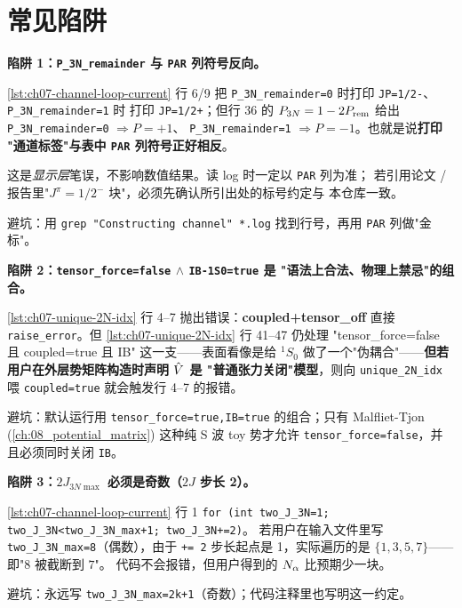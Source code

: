 \section{常见陷阱}
\label{sec:ch07-pitfalls}

\begin{pitfallbox}[label={box:ch07-pitfall-pi-print}]
\textbf{陷阱 1：\texttt{P\_3N\_remainder} 与 \texttt{PAR} 列符号反向。}

\cref{lst:ch07-channel-loop-current} 行 6/9 把
\verb|P_3N_remainder=0| 时打印 \verb|JP=1/2-|、\verb|P_3N_remainder=1| 时
打印 \verb|JP=1/2+|；但行 36 的 \(P_{3N} = 1 - 2 P_{\rm rem}\) 给出
\verb|P_3N_remainder=0| \(\Rightarrow P = +1\)、
\verb|P_3N_remainder=1| \(\Rightarrow P = -1\)。也就是说\textbf{打印
"通道标签"与表中 \texttt{PAR} 列符号正好相反}。

这是\emph{显示层}笔误，不影响数值结果。读 log 时一定以 \texttt{PAR} 列为准；
若引用论文 / 报告里"\(J^\pi = 1/2^-\) 块"，必须先确认所引出处的标号约定与
本仓库一致。

避坑：用 \verb|grep "Constructing channel" *.log| 找到行号，再用 \texttt{PAR}
列做"金标"。
\end{pitfallbox}

\begin{pitfallbox}
\textbf{陷阱 2：\texttt{tensor\_force=false} \(\wedge\) \texttt{IB-1S0=true} 是
"语法上合法、物理上禁忌"的组合。}

\cref{lst:ch07-unique-2N-idx} 行 4--7 抛出错误：\textbf{coupled+tensor\_off} 直接
\texttt{raise\_error}。但 \cref{lst:ch07-unique-2N-idx} 行 41--47 仍处理
"tensor\_force=false 且 coupled=true 且 IB" 这一支——表面看像是给 \({}^1S_0\)
做了一个"伪耦合"——\textbf{但若用户在外层势矩阵构造时声明 \(\hat{V}\) 是
"普通张力关闭"模型}，则向 \texttt{unique\_2N\_idx} 喂 \verb|coupled=true|
就会触发行 4--7 的报错。

避坑：默认运行用 \texttt{tensor\_force=true,\;IB=true} 的组合；只有
Malfliet-Tjon (\cref{ch:08_potential_matrix}) 这种纯 S 波 toy 势才允许
\texttt{tensor\_force=false}，并且必须同时关闭 \texttt{IB}。
\end{pitfallbox}

\begin{pitfallbox}
\textbf{陷阱 3：\(2J_{3N\max}\) 必须是奇数（\(2J\) 步长 2）。}

\cref{lst:ch07-channel-loop-current} 行 1
\verb|for (int two_J_3N=1; two_J_3N<two_J_3N_max+1; two_J_3N+=2)|。
若用户在输入文件里写 \verb|two_J_3N_max=8|（偶数），由于 \verb|+= 2|
步长起点是 1，实际遍历的是 \(\{1, 3, 5, 7\}\)——即"\(8\) 被截断到 \(7\)"。
代码不会报错，但用户得到的 \(N_\alpha\) 比预期少一块。

避坑：永远写 \verb|two_J_3N_max=2k+1|（奇数）；代码注释里也写明这一约定。
\end{pitfallbox}

